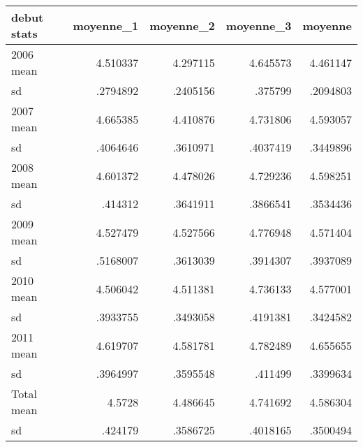 \begin{center}
\begin{tabular} {@{} l r r r r @{}} \\ \hline
\textbf{debut       stats } & \textbf{  moyenne\_1} & \textbf{  moyenne\_2} & \textbf{  moyenne\_3} & \textbf{   moyenne} \\
\hline
2006         mean  &   4.510337 &   4.297115 &   4.645573 &   4.461147 \\
               sd  &   .2794892 &   .2405156 &    .375799 &   .2094803 \\
2007         mean  &   4.665385 &   4.410876 &   4.731806 &   4.593057 \\
               sd  &   .4064646 &   .3610971 &   .4037419 &   .3449896 \\
2008         mean  &   4.601372 &   4.478026 &   4.729236 &   4.598251 \\
               sd  &    .414312 &   .3641911 &   .3866541 &   .3534436 \\
2009         mean  &   4.527479 &   4.527566 &   4.776948 &   4.571404 \\
               sd  &   .5168007 &   .3613039 &   .3914307 &   .3937089 \\
2010         mean  &   4.506042 &   4.511381 &   4.736133 &   4.577001 \\
               sd  &   .3933755 &   .3493058 &   .4191381 &   .3424582 \\
2011         mean  &   4.619707 &   4.581781 &   4.782489 &   4.655655 \\
               sd  &   .3964997 &   .3595548 &    .411499 &   .3399634 \\
Total        mean  &     4.5728 &   4.486645 &   4.741692 &   4.586304 \\
               sd  &    .424179 &   .3586725 &   .4018165 &   .3500494 \\
\hline
\end{tabular}

\end{center}